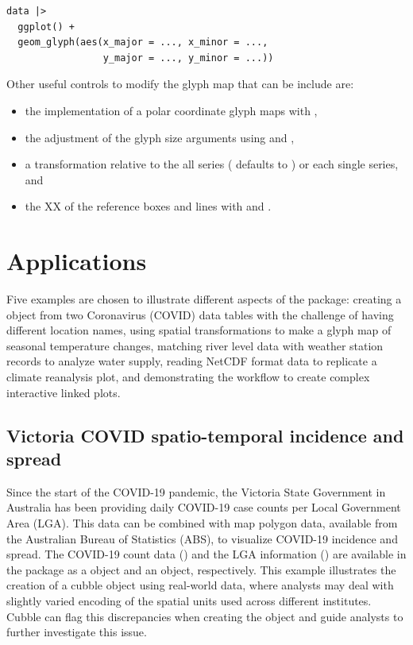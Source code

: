 \documentclass[
  shortnames]{jss}
\providecommand{\tightlist}{%
  \setlength{\itemsep}{0pt}\setlength{\parskip}{0pt}}
\begin{document}
\begin{verbatim}
data |> 
  ggplot() +
  geom_glyph(aes(x_major = ..., x_minor = ..., 
                 y_major = ..., y_minor = ...))
\end{verbatim}

Other useful controls to modify the glyph map that can be include are:

\begin{itemize}
\tightlist
\item
  the implementation of a polar coordinate glyph maps with ,
\item
  the adjustment of the glyph size arguments using  and ,
\item
  a transformation relative to the all series ( defaults to ) or each single series, and
\item
  the XX of the reference boxes and lines with  and .
\end{itemize}

\hypertarget{examples}{%
\section{Applications}\label{examples}}

Five examples are chosen to illustrate different aspects of the  package: creating a  object from two Coronavirus (COVID) data tables with the challenge of having different location names, using spatial transformations to make a glyph map of seasonal temperature changes, matching river level data with weather station records to analyze water supply, reading NetCDF format data to replicate a climate reanalysis plot, and demonstrating the workflow to create complex interactive linked plots.

\hypertarget{covid}{%
\subsection{Victoria COVID spatio-temporal incidence and spread}\label{covid}}

Since the start of the COVID-19 pandemic, the Victoria State Government in Australia has been providing daily COVID-19 case counts per Local Government Area (LGA). This data can be combined with map polygon data, available from the Australian Bureau of Statistics (ABS), to visualize COVID-19 incidence and spread. The COVID-19 count data () and the LGA information () are available in the  package as a  object and an  object, respectively. This example illustrates the creation of a cubble object using real-world data, where analysts may deal with slightly varied encoding of the spatial units used across different institutes. Cubble can flag this discrepancies when creating the object and guide analysts to further investigate this issue.
\end{document}
